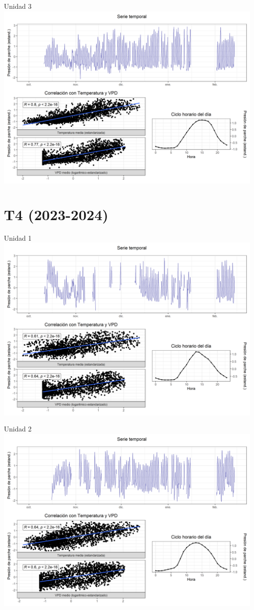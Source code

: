 \documentclass[
  letterpaper,
  DIV=11,
  numbers=noendperiod]{scrreprt}
\begin{document}
Unidad 3
\includegraphics{figuras/04_turgor_unidad/2023_2024_La_Esperanza_T3_Unidad_3.png}

\chapter{T4 (2023-2024)}

Unidad 1
\includegraphics{figuras/04_turgor_unidad/2023_2024_La_Esperanza_T4_Unidad_1.png}

Unidad 2
\includegraphics{figuras/04_turgor_unidad/2023_2024_La_Esperanza_T4_Unidad_2.png}
\end{document}
